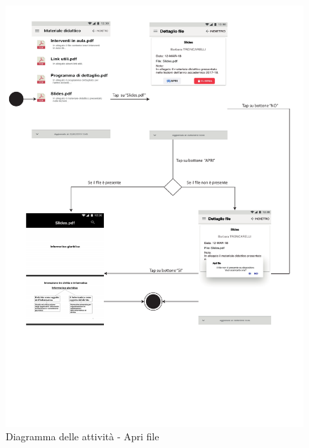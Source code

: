 \begin{figure}
	\centering
	\includegraphics[width=6in]{imgs/gruppo1/activity_diagrams/AD16_apri_file.pdf}
	\caption{Diagramma delle attività - Apri file}
	\label{diag:apriFileAD}
\end{figure}
\newpage

